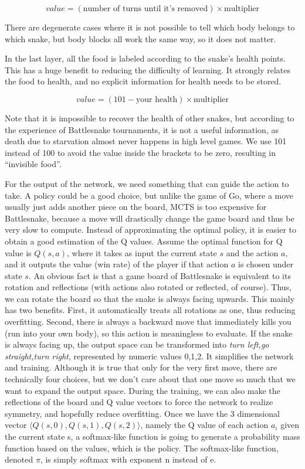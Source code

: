 \documentclass{article}
\begin{document}
\begin{equation}
  value = (\text{number of turns until it's removed}) \times \text{multiplier}
\end{equation}

There are degenerate cases where it is not possible to tell which body belongs
to which snake, but body blocks all work the same way, so it does not matter.

In the last layer, all the food is labeled according to the snake's health points. This
has a huge benefit to reducing the difficulty of learning. It strongly relates
the food to health, and no explicit information for health needs to be
stored.

\begin{equation}
  value = (101-\text{your health}) \times \text{multiplier}
\end{equation}

Note that it is impossible to recover the health of other snakes, but
according to the experience of Battlesnake tournaments, it is not a useful
information, as death due to starvation almost never happens in high level
games. We use 101 instead of 100 to avoid the value inside the brackets to be
zero, resulting in “invisible food”.

For the output of the network, we need something that can guide the action to
take. A policy could be a good choice, but unlike the game of Go, where a move
usually just adds another piece on the board, MCTS is too expensive for
Battlesnake, because a move will drastically change the game board and thus be very
slow to compute. Instead of approximating the optimal policy, it is easier to
obtain a good estimation of the Q values. Assume the optimal function for Q
value is $Q(s,a)$, where it takes as input the current state $s$ and the action
$a$, and it outputs the value (win rate) of the player if that action $a$ is
chosen under state $s$. An obvious fact is that a game board of Battlesnake is
equivalent to its rotation and reflections (with actions also rotated or
reflected, of course). Thus, we can rotate the board so that the snake is always
facing upwards. This mainly has two benefits. First, it automatically treats all
rotations as one, thus reducing overfitting. Second, there is always a backward
move that immediately kills you (run into your own body), so this action is
meaningless to evaluate. If the snake is always facing up, the output space can
be transformed into \textit{turn left,go straight,turn right}, represented by
numeric values {0,1,2}. It simplifies the network and training. Although it is
true that only for the very first move, there are technically four choices, but
we don’t care about that one move so much that we want to expand the output
space. During the training, we can also make the reflections of the board and Q
value vectors to force the network to realize symmetry, and hopefully reduce
overfitting. Once we have the 3 dimensional vector $\langle Q(s,0),Q(s,1),Q(s,2)
  \rangle$, namely the Q value of each action $a_i$ given the current state s, a
softmax-like function is going to generate a probability mass function based on
the values, which is the policy. The softmax-like function, denoted $\pi$, is simply
softmax with exponent n instead of e.
\end{document}
